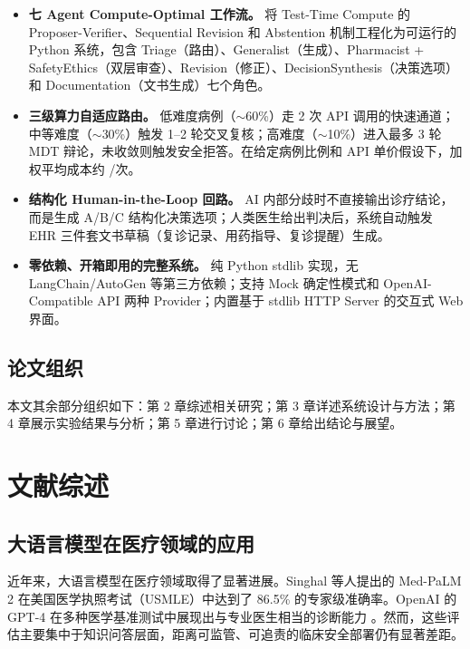 \documentclass[11pt,a4paper]{ctexart}
\begin{document}
\begin{itemize}[leftmargin=2em]
    \item[\textbf{C1.}] \textbf{七 Agent Compute-Optimal 工作流。} 将 Test-Time Compute 的 Proposer-Verifier、Sequential Revision 和 Abstention 机制工程化为可运行的 Python 系统，包含 Triage（路由）、Generalist（生成）、Pharmacist + SafetyEthics（双层审查）、Revision（修正）、DecisionSynthesis（决策选项）和 Documentation（文书生成）七个角色。
    \item[\textbf{C2.}] \textbf{三级算力自适应路由。} 低难度病例（$\sim$60\%）走 2 次 API 调用的快速通道；中等难度（$\sim$30\%）触发 1--2 轮交叉复核；高难度（$\sim$10\%）进入最多 3 轮 MDT 辩论，未收敛则触发安全拒答。在给定病例比例和 API 单价假设下，加权平均成本约 /次。
    \item[\textbf{C3.}] \textbf{结构化 Human-in-the-Loop 回路。} AI 内部分歧时不直接输出诊疗结论，而是生成 A/B/C 结构化决策选项；人类医生给出判决后，系统自动触发 EHR 三件套文书草稿（复诊记录、用药指导、复诊提醒）生成。
    \item[\textbf{C4.}] \textbf{零依赖、开箱即用的完整系统。} 纯 Python stdlib 实现，无 LangChain/AutoGen 等第三方依赖；支持 Mock 确定性模式和 OpenAI-Compatible API 两种 Provider；内置基于 stdlib HTTP Server 的交互式 Web 界面。
\end{itemize}

\subsection{论文组织}

本文其余部分组织如下：第 2 章综述相关研究；第 3 章详述系统设计与方法；第 4 章展示实验结果与分析；第 5 章进行讨论；第 6 章给出结论与展望。

\newpage
\section{文献综述}

\subsection{大语言模型在医疗领域的应用}

近年来，大语言模型在医疗领域取得了显著进展。Singhal 等人提出的 Med-PaLM 2 \cite{singhal2023medpalm} 在美国医学执照考试（USMLE）中达到了 86.5\% 的专家级准确率。OpenAI 的 GPT-4 在多种医学基准测试中展现出与专业医生相当的诊断能力 \cite{nori2023capabilities}。然而，这些评估主要集中于知识问答层面，距离可监管、可追责的临床安全部署仍有显著差距。
\end{document}
